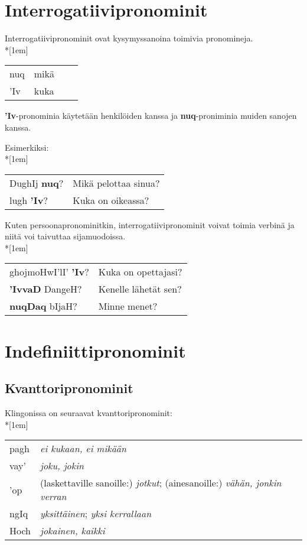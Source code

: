 \documentclass{book}
\begin{document}
\section{Interrogatiivipronominit}

Interrogatiivipronominit ovat kysymyssanoina toimivia pronomineja.\\*[1em]
\begin{tabular}{Bl Il}
    nuq & mikä \\
    'Iv & kuka \\
\end{tabular}

\textbf{'Iv}-pronominia käytetään henkilöiden kanssa ja \textbf{nuq}-proniminia muiden sanojen kanssa.

Esimerkiksi:\\*[1em]
\begin{tabular}{l l}
    DughIj \textbf{nuq}? & Mikä pelottaa sinua? \\
    lugh \textbf{'Iv}? & Kuka on oikeassa? \\
\end{tabular}

Kuten persoonapronominitkin, interrogatiivipronominit voivat toimia verbinä ja niitä voi taivuttaa sijamuodoissa.\\*[1em]
\begin{tabular}{l l}
    ghojmoHwI'lI' \textbf{'Iv}? & Kuka on opettajasi? \\
    \textbf{'IvvaD} DangeH? & Kenelle lähetät sen? \\
    \textbf{nuqDaq} bIjaH? & Minne menet? \\
\end{tabular}

\section{Indefiniittipronominit}

\subsection{Kvanttoripronominit}

Klingonissa on seuraavat kvanttoripronominit:\\*[1em]
\begin{tabular}{Bl l}
    pagh & \textit{ei kukaan, ei mikään} \\
    vay' & \textit{joku, jokin} \\
    'op & (laskettaville sanoille:) \textit{jotkut}; (ainesanoille:) \textit{vähän, jonkin verran} \\
    ngIq & \textit{yksittäinen}; \textit{yksi kerrallaan} \\
    Hoch & \textit{jokainen, kaikki} \\
\end{tabular}
\end{document}
